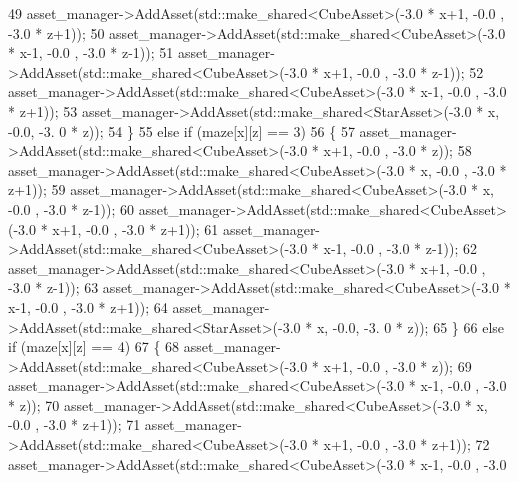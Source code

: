 \begin{DoxyCode}
49                                 asset\_manager->AddAsset(std::make\_shared<CubeAsset>(-3.0 * x+1, -0.0 , -3.0
       * z+1)); 
50                                 asset\_manager->AddAsset(std::make\_shared<CubeAsset>(-3.0 * x-1, -0.0 , -3.0
       * z-1));
51                                 asset\_manager->AddAsset(std::make\_shared<CubeAsset>(-3.0 * x+1, -0.0 , -3.0
       * z-1));
52                                 asset\_manager->AddAsset(std::make\_shared<CubeAsset>(-3.0 * x-1, -0.0 , -3.0
       * z+1));
53                                     asset\_manager->AddAsset(std::make\_shared<StarAsset>(-3.0 * x, -0.0, -3.
      0 * z));
54                         \}
55                     \textcolor{keywordflow}{else} \textcolor{keywordflow}{if} (maze[x][z] == 3)
56                         \{       
57                                 asset\_manager->AddAsset(std::make\_shared<CubeAsset>(-3.0 * x+1, -0.0 , -3.0
       * z));
58                                 asset\_manager->AddAsset(std::make\_shared<CubeAsset>(-3.0 * x,   -0.0 , -3.0
       * z+1));
59                                 asset\_manager->AddAsset(std::make\_shared<CubeAsset>(-3.0 * x,   -0.0 , -3.0
       * z-1)); 
60                                 asset\_manager->AddAsset(std::make\_shared<CubeAsset>(-3.0 * x+1, -0.0 , -3.0
       * z+1)); 
61                                 asset\_manager->AddAsset(std::make\_shared<CubeAsset>(-3.0 * x-1, -0.0 , -3.0
       * z-1));
62                                 asset\_manager->AddAsset(std::make\_shared<CubeAsset>(-3.0 * x+1, -0.0 , -3.0
       * z-1)); 
63                                 asset\_manager->AddAsset(std::make\_shared<CubeAsset>(-3.0 * x-1, -0.0 , -3.0
       * z+1)); 
64                                     asset\_manager->AddAsset(std::make\_shared<StarAsset>(-3.0 * x, -0.0, -3.
      0 * z));
65                         \}
66                         \textcolor{keywordflow}{else} \textcolor{keywordflow}{if} (maze[x][z] == 4)
67                             \{   
68                                 asset\_manager->AddAsset(std::make\_shared<CubeAsset>(-3.0 * x+1, -0.0 , -3.0
       * z)); 
69                                 asset\_manager->AddAsset(std::make\_shared<CubeAsset>(-3.0 * x-1, -0.0 , -3.0
       * z)); 
70                                 asset\_manager->AddAsset(std::make\_shared<CubeAsset>(-3.0 * x,   -0.0 , -3.0
       * z+1)); 
71                                 asset\_manager->AddAsset(std::make\_shared<CubeAsset>(-3.0 * x+1, -0.0 , -3.0
       * z+1)); 
72                                 asset\_manager->AddAsset(std::make\_shared<CubeAsset>(-3.0 * x-1, -0.0 , -3.0

\end{DoxyCode}
